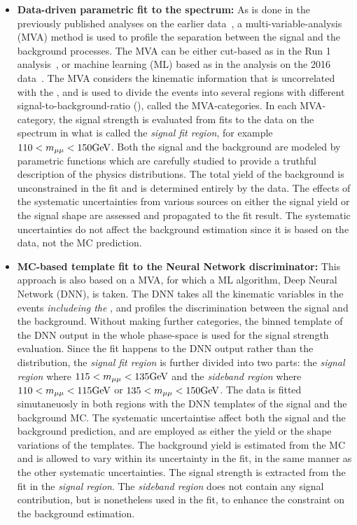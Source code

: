 \begin{itemize}
    \item \textbf{Data-driven parametric fit to the \mmm spectrum:} 
          As is done in the previously published analyses on the earlier data~\cite{2015184, PhysRevLett.122.021801},  
          a multi-variable-analysis (MVA) method is used to profile the separation between the signal and the background processes. 
          The MVA can be either cut-based as in the Run 1 analysis~\cite{2015184}, or machine learning (ML) based as in the analysis on the 2016 data~\cite{PhysRevLett.122.021801}.
          The MVA considers the kinematic information that is uncorrelated with the \mmm, and is used to divide the events into several regions 
          with different signal-to-background-ratio (\SoB), called the MVA-categories. 
          In each MVA-category, the signal strength is evaluated from fits to the data on the \mmm spectrum in what is called the \textit{signal fit region}, for example $110<m_{\mu\mu}<150 \mbox{GeV}$.
          Both the signal and the background are modeled by parametric functions which are carefully studied to provide a truthful description of the physics distributions. 
          The total yield of the background is unconstrained in the fit and is determined entirely by the data.
          The effects of the systematic uncertainties from various sources on either the signal yield or the signal shape are assessed and propagated to the fit result. 
          The systematic uncertainties do not affect the background estimation since it is based on the data, not the MC prediction.
    \item \textbf{MC-based template fit to the Neural Network discriminator:}
          This approach is also based on a MVA, for which a ML algorithm, Deep Neural Network (DNN), is taken.
          The DNN takes all the kinematic variables in the events \textit{includeing the \mmm}, and profiles the discrimination between the signal and the background.
          Without making further categories, the binned template of the DNN output in the whole phase-space is used for the signal strength evaluation.
          Since the fit happens to the DNN output rather than the \mmm distribution, the \textit{signal fit region} is further divided into two parts:
          the \textit{signal region} where $115<m_{\mu\mu}<135 \mbox{GeV}$ and the \textit{sideband region} where $110<m_{\mu\mu}<115 \mbox{GeV}$ or $135<m_{\mu\mu}<150 \mbox{GeV}$.
          The data is fitted simutaneuosly in both regions with the DNN templates of the signal and the background MC. 
          The systematic uncertaintise affect both the signal and the background prediction, and are employed as either the yield or the shape variations of the templates.
          The background yield is estimated from the MC and is allowed to vary within its uncertainty in the fit, in the same manner as the other systematic uncertainties.
          The signal strength is extracted from the fit in the \textit{signal region}.
          The \textit{sideband region} does not contain any signal contribution, but is nonetheless used in the fit, to enhance the constraint on the background estimation.
\end{itemize}

